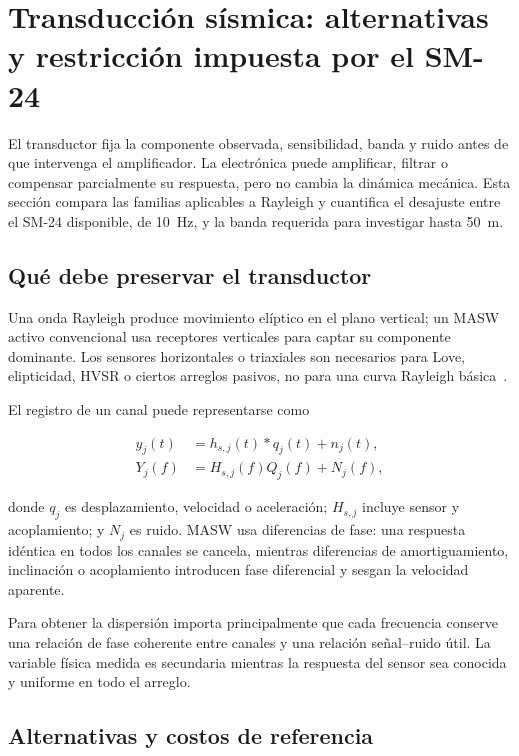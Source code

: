 \section{Transducción sísmica: alternativas y restricción impuesta por el SM-24}
\label{sec:transductores}

El transductor fija la componente observada, sensibilidad, banda y ruido antes de que
intervenga el amplificador. La electrónica puede amplificar, filtrar o compensar
parcialmente su respuesta, pero no cambia la dinámica mecánica. Esta sección compara las
familias aplicables a Rayleigh y cuantifica el desajuste entre el SM-24 disponible, de
\SI{10}{\hertz}, y la banda requerida para investigar hasta \SI{50}{\meter}.

\subsection{Qué debe preservar el transductor}

Una onda Rayleigh produce movimiento elíptico en el plano vertical; un MASW activo
convencional usa receptores verticales para captar su componente dominante. Los sensores
horizontales o triaxiales son necesarios para Love, elipticidad, HVSR o ciertos arreglos
pasivos, no para una curva Rayleigh básica~\cite{Foti2014,Park1999}.

El registro de un canal puede representarse como

\begin{equation}
\begin{aligned}
    y_j(t)&=h_{s,j}(t)*q_j(t)+n_j(t),\\
    Y_j(f)&=H_{s,j}(f)Q_j(f)+N_j(f),
\end{aligned}
    \label{eq:transductor-medicion}
\end{equation}

donde $q_j$ es desplazamiento, velocidad o aceleración; $H_{s,j}$ incluye sensor y
acoplamiento; y $N_j$ es ruido. MASW usa diferencias de fase: una respuesta idéntica en
todos los canales se cancela, mientras diferencias de amortiguamiento, inclinación o
acoplamiento introducen fase diferencial y sesgan la velocidad aparente.

Para obtener la dispersión importa principalmente que cada frecuencia conserve una
relación de fase coherente entre canales y una relación señal--ruido útil. La variable
física medida es secundaria mientras la respuesta del sensor sea conocida y uniforme
en todo el arreglo.

\subsection{Alternativas y costos de referencia}

